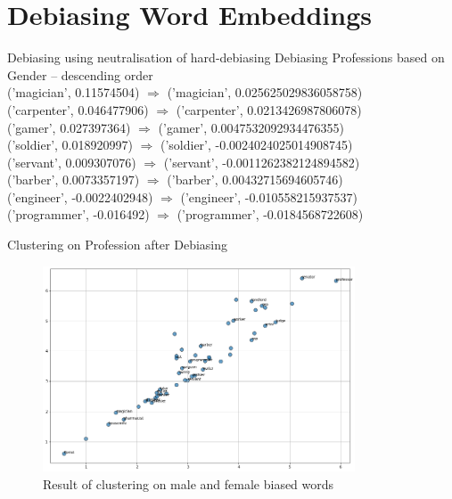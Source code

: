 \documentclass{beamer}
\begin{document}
	\section{Debiasing Word Embeddings}
		\begin{frame}{Debiasing using neutralisation of hard-debiasing}		
			Debiasing Professions based on Gender -- descending order \\
			('magician', 0.11574504) $\Rightarrow$ ('magician', 0.025625029836058758)
\\
			('carpenter', 0.046477906) $\Rightarrow$ ('carpenter', 0.0213426987806078) \\
			('gamer', 0.027397364) $\Rightarrow$ ('gamer', 0.0047532092934476355)
\\
			('soldier', 0.018920997) $\Rightarrow$ ('soldier', -0.0024024025014908745)
\\
			('servant', 0.009307076) $\Rightarrow$ ('servant', -0.0011262382124894582)
\\
			('barber', 0.0073357197) $\Rightarrow$ ('barber', 0.00432715694605746)
\\
			('engineer', -0.0022402948) $\Rightarrow$ ('engineer', -0.010558215937537)
\\
			('programmer', -0.016492) $\Rightarrow$ ('programmer', -0.0184568722608)
		\end{frame}
		\begin{frame}{Clustering on Profession after Debiasing}
			\vspace{3mm}
			\begin{figure}[H]
				\centerline{\includegraphics[width=25em]{dwe1.png}}
				\caption{Result of clustering on male and female biased words}
				\label{profession-debias-fig}
			\end{figure}
		\end{frame}
			
\end{document}
